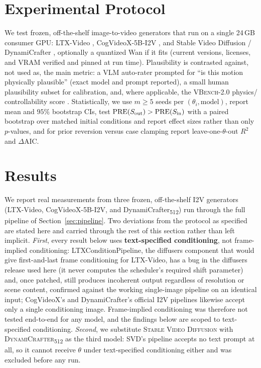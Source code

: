 \documentclass[10pt,twocolumn,letterpaper]{article}
\begin{document}
\section{Experimental Protocol}
\label{sec:protocol}

We test frozen, off-the-shelf image-to-video generators that run on a single
24\,GB consumer GPU: LTX-Video \citep{hacohen2024ltxvideo}, CogVideoX-5B-I2V
\citep{yang2024cogvideox}, and Stable Video Diffusion / DynamiCrafter
\citep{blattmann2023svd,xing2024dynamicrafter}, optionally a quantized Wan
\citep{wan2025} if it fits (current versions, licenses, and VRAM verified and
pinned at run time). Plausibility is contrasted against, not used as, the main
metric: a VLM auto-rater prompted for ``is this motion physically plausible''
(exact model and prompt reported), a small human plausibility subset for
calibration, and, where applicable, the \textsc{VBench-2.0} physics/
controllability score \citep{vbench2_2025}. Statistically, we use $m\ge5$
seeds per $(\theta_i,\text{model})$, report mean and $95\%$ bootstrap CIs, test
$\mathrm{PRE}(S_\text{out})>\mathrm{PRE}(S_\text{in})$ with a paired bootstrap over matched
initial conditions and report effect sizes rather than only $p$-values, and for
prior reversion versus case clamping report leave-one-$\theta$-out $R^2$ and
$\Delta$AIC.

\section{Results}
\label{sec:results}

We report real measurements from three frozen, off-the-shelf I2V generators
(LTX-Video, CogVideoX-5B-I2V, and DynamiCrafter\textsubscript{512}) run
through the full pipeline of Section~\ref{sec:pipeline}. Two deviations from
the protocol as specified are stated here and carried through the rest of
this section rather than left implicit. \emph{First}, every result below uses
\textbf{text-specified conditioning}, not frame-implied conditioning:
LTXConditionPipeline, the diffusers component that would give first-and-last
frame conditioning for LTX-Video, has a bug in the diffusers release used
here (it never computes the scheduler's required shift parameter) and, once
patched, still produces incoherent output regardless of resolution or scene
content, confirmed against the working single-image pipeline on an identical
input; CogVideoX's and DynamiCrafter's official I2V pipelines likewise accept
only a single conditioning image. Frame-implied conditioning was therefore not tested end-to-end for
any model, and the findings below are scoped to text-specified conditioning.
\emph{Second}, we substitute \textsc{Stable Video Diffusion} with
\textsc{DynamiCrafter}\textsubscript{512} as the third model: SVD's pipeline
accepts no text prompt at all, so it cannot receive $\theta$ under text-specified conditioning either
and was excluded before any run.
\end{document}
